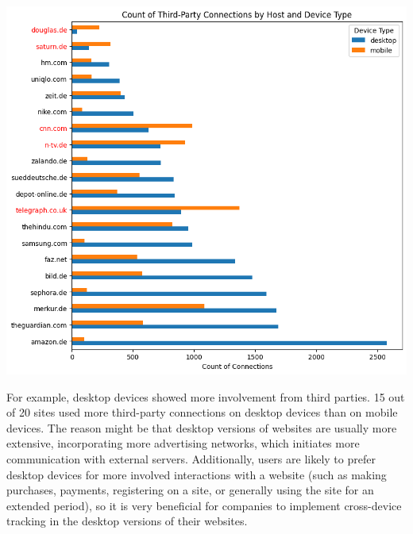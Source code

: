 \begin{minipage}{0.6\textwidth} 
    \includegraphics[width=\linewidth]{./assets/comparison51.png} 
\end{minipage}
\vspace{0.8cm}

For example, desktop devices showed more involvement from third parties. 15 out of 20 sites used more third-party connections on desktop devices than on mobile devices. The reason might be that desktop versions of websites are usually more extensive, incorporating more advertising networks, which initiates more communication with external servers. Additionally, users are likely to prefer desktop devices for more involved interactions with a website (such as making purchases, payments, registering on a site, or generally using the site for an extended period), so it is very beneficial for companies to implement cross-device tracking in the desktop versions of their websites.

